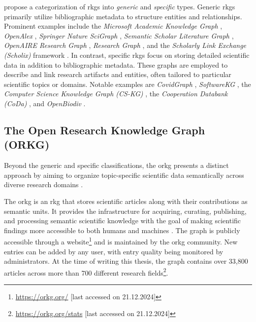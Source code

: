 \textcite{karras_divide_2023} propose a categorization of \glspl{rkg} into \emph{generic} and \emph{specific} types. Generic \glspl{rkg} primarily utilize bibliographic metadata to structure entities and relationships. Prominent examples include the \emph{Microsoft Academic Knowledge Graph} \cite{ghidini_microsoft_2019,farber_microsoft_2022}, \emph{OpenAlex} \cite{priem_openalex_2022}, \emph{Springer Nature SciGraph} \cite{hammond_data_2017}, \emph{Semantic Scholar Literature Graph} \cite{kinney_semantic_2023}, \emph{OpenAIRE Research Graph} \cite{manghi_data_2012}, \emph{Research Graph} \cite{aryani_research_2017}, and the \emph{Scholarly Link Exchange (Scholix)} framework \cite{burton_scholix_2017}. In contrast, specific \glspl{rkg} focus on storing detailed scientific data in addition to bibliographic metadata. These graphs are employed to describe and link research artifacts and entities, often tailored to particular scientific topics or domains. Notable examples are \emph{CovidGraph} \cite{domingo-fernandez_covid-19_2021}, \emph{SoftwareKG} \cite{harth_investigating_2020}, the \emph{Computer Science Knowledge Graph (CS-KG)} \cite{sattler_cs-kg_2022}, the \emph{Cooperation Databank (CoDa)} \cite{spadaro_cooperation_2022}, and \emph{OpenBiodiv} \cite{penev_openbiodiv_2019}.


\subsection{The Open Research Knowledge Graph (ORKG)}

Beyond the generic and specific classifications, the \acrfull{orkg} presents a distinct approach by aiming to organize topic-specific scientific data semantically across diverse research domains \cite{karras_divide_2023}.

The \gls{orkg} is an \gls{rkg} that stores scientific articles along with their contributions as semantic units. It provides the infrastructure for acquiring, curating, publishing, and processing semantic scientific knowledge with the goal of making scientific findings more accessible to both humans and machines \cite{jaradeh_open_2019-1}. The graph is publicly accessible through a website\footnote{\url{https://orkg.org/} [last accessed on 21.12.2024]} and is maintained by the \gls{orkg} community. New entries can be added by any user, with entry quality being monitored by administrators. At the time of writing this thesis, the graph contains over 33,800 articles across more than 700 different research fields\footnote{\url{https://orkg.org/stats} [last accessed on 21.12.2024]}.


